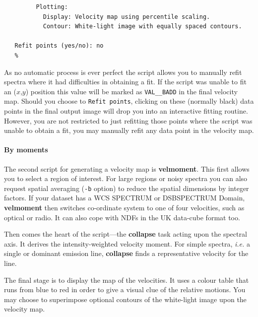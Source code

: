 \documentclass[twoside,11pt]{article}
\newcommand{\htmlref}[2]{#1}
\newcommand{\xref}[3]{#1}
\newcommand{\xlabel}[1]{}
\begin{document}
{\begin{verbatim}
         Plotting:
           Display: Velocity map using percentile scaling.
           Contour: White-light image with equally spaced contours.
 
   Refit points (yes/no): no
   %
\end{verbatim}\normalsize

As no automatic process is ever perfect the script allows you to
manually refit spectra where it had difficulties in obtaining a fit.
If the script was unable to fit an ($x$,$y$) position this value will be
marked as {\tt VAL\_\_BADD} in the final velocity map.  Should you choose
to {\tt Refit points}, clicking on these (normally black) data points in
the final output image will drop you into an interactive fitting
routine.  However, you are not restricted to just refitting those points
where the script was unable to obtain a fit, you may manually refit
any data point in the velocity map.

\paragraph{\label{sc16_velmoment}\latexonly{\vspace*{0.8em}}By
moments\latexonly{\newline}\xlabel{sc16_velmoment}}

\hspace*{-2.1ex}The second script for generating a velocity map is \xref{{\bf
velmoment}}{sun237}{velmoment}.  This first allows you to select a
region of interest.  For large regions or noisy spectra you can also
request spatial averaging ({\tt -b} option) to reduce the spatial
dimensions by integer factors.  If your dataset has a WCS
\xref{SPECTRUM or DSBSPECTRUM Domain}{sun95}{se_domains}, {\bf velmoment}
then switches co-ordinate system to one of four velocities, such as
optical or radio.  It can also cope with NDFs in the
\htmlref{UK data-cube format}{sc16_teifufile} too.

Then comes the heart of the script---the 
\xref{{\bf collapse}}{sun95}{COLLAPSE} task acting upon the spectral
axis.  It derives the intensity-weighted velocity moment.  For simple
spectra, \emph{i.e.} a single or dominant emission line, {\bf
collapse} finds a representative velocity for the line.

The final stage is to display the map of the velocities.  It uses a
colour table that runs from blue to red in order to give a visual clue
of the relative motions.  You may choose to superimpose optional
contours of the white-light image upon the velocity map.

}
\end{document}
